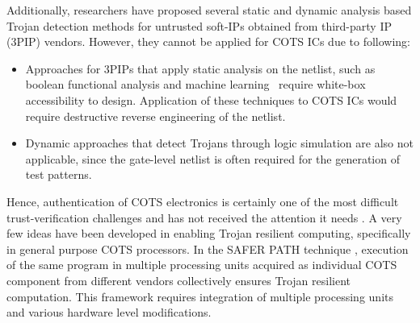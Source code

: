 \documentclass[conference]{IEEEtran}
\begin{document}
Additionally, researchers have proposed several static and dynamic analysis based Trojan detection methods for untrusted soft-IPs obtained from  third-party IP (3PIP) vendors. 
However, they cannot be applied for COTS ICs due to following:
\begin{itemize}


\item  Approaches for 3PIPs that apply static analysis on the netlist, such as boolean functional analysis \cite{ref:fanci} and machine learning~\cite{hoque2018hardware2} require white-box accessibility to design. Application of these techniques to COTS ICs would require destructive reverse engineering of the netlist.  
\item Dynamic approaches that detect Trojans through logic simulation are also not applicable, since the gate-level netlist is often required for the generation of test patterns.   
\end{itemize}



Hence, authentication of COTS electronics is certainly one of the most difficult trust-verification challenges and has not received the attention it needs \cite{xiao2016hardware}. 
A very few ideas have been developed in enabling Trojan resilient computing, specifically in general purpose COTS processors. In the SAFER PATH technique \cite{ref:safer}, execution of the same program in multiple processing units acquired as individual COTS component from different vendors collectively ensures Trojan resilient computation. This framework requires integration of multiple processing units and various hardware level modifications.
\end{document}

